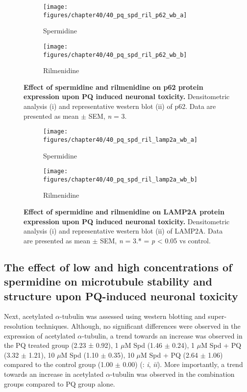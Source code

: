 \begin{figure}[!htbp]
  \center
  \begin{subfigure}[b]{0.495\linewidth}
    \texttt{[image: figures/chapter40/40\_pq\_spd\_ril\_p62\_wb\_a]}
    \caption{Spermidine}
  \end{subfigure}
  \begin{subfigure}[b]{0.495\linewidth}
    \texttt{[image: figures/chapter40/40\_pq\_spd\_ril\_p62\_wb\_b]}
    \caption{Rilmenidine}
  \end{subfigure}
  \caption[Effect of spermidine and rilmenidine on p62 protein expression upon PQ induced neuronal toxicity]{\textbf{Effect of spermidine and rilmenidine on p62 protein expression upon PQ induced neuronal toxicity.} Densitometric analysis (i) and representative western blot  (ii) of p62. Data are presented as mean $\pm$ SEM, \textit{n} = 3.}
  \label{fig:40_pq_spd_ril_p62_wb_a}
\end{figure}
  
\begin{figure}[!htbp]
  \center
  \begin{subfigure}[b]{0.495\linewidth}
    \texttt{[image: figures/chapter40/40\_pq\_spd\_ril\_lamp2a\_wb\_a]}
    \caption{Spermidine}
  \end{subfigure}
  \begin{subfigure}[b]{0.495\linewidth}
    \texttt{[image: figures/chapter40/40\_pq\_spd\_ril\_lamp2a\_wb\_b]}
    \caption{Rilmenidine}
  \end{subfigure}
  \caption[Effect of spermidine and rilmenidine on LAMP2A protein expression upon PQ induced neuronal toxicity]{\textbf{Effect of spermidine and rilmenidine on LAMP2A protein expression upon PQ induced neuronal toxicity.} Densitometric analysis (i) and representative western blot  (ii) of LAMP2A. Data are presented as mean $\pm$ SEM, \textit{n} = 3.* = \textit{p} < 0.05 vs control.}
  \label{fig:40_pq_spd_ril_lamp2a_wb_a}
\end{figure}


\subsection{The effect of low and high concentrations of spermidine on microtubule stability and structure upon PQ-induced neuronal toxicity}
Next, acetylated $\alpha$-tubulin was assessed using western blotting and super-resolution techniques. Although, no significant differences were observed in the expression of acetylated $\alpha$-tubulin, a trend towards an increase was observed in the PQ treated group (2.23 ± 0.92), 1 $\mu$M Spd (1.46 $\pm$ 0.24), 1 $\mu$M Spd + PQ (3.32 $\pm$ 1.21), 10 $\mu$M Spd (1.10 $\pm$ 0.35), 10 $\mu$M Spd + PQ (2.64 $\pm$ 1.06) compared to the control group (1.00 $\pm$ 0.00) (: \textit{i}, \textit{ii}). More importantly, a trend towards an increase in acetylated $\alpha$-tubulin was observed in the combination groups compared to PQ group alone. 


